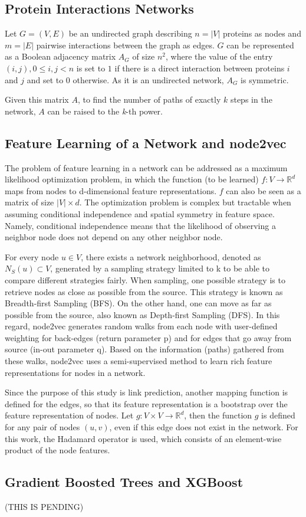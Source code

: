 \subsection*{Protein Interactions Networks}
Let $G=(V,E)$ be an undirected graph describing $n=|V|$ proteins as 
nodes and $m=|E|$ pairwise interactions between the graph as edges. 
$G$ can be represented as a Boolean adjacency matrix $A_G$ of size 
$n^2$, where the value of the entry $(i,j), 0\leq i,j < n$ is set 
to $1$ if there is a direct interaction between proteins $i$ and $j$ 
and set to $0$ otherwise. As it is an undirected network, $A_G$ is symmetric.

Given this matrix $A$, to find the number of paths of exactly $k$ steps 
in the network, $A$ can be raised to the \textit{k}-th power.

\subsection*{Feature Learning of a Network and node2vec}
The problem of feature learning in a network can be addressed as a maximum 
likelihood optimization problem, in which the function (to be learned) 
$f : V \rightarrow \mathbb{R}^d$ maps from nodes to d-dimensional feature 
representations. $f$ can also be seen as a matrix of size $|V| \times d$. 
The optimization problem is complex but tractable when assuming conditional 
independence and spatial symmetry in feature space. Namely, conditional 
independence means that the likelihood of observing a neighbor node does 
not depend on any other neighbor node.

For every node $u \in V$, there exists a network neighborhood, denoted as 
$N_S (u) \subset V$, generated by a sampling strategy limited to k to be 
able to compare different strategies fairly. When sampling, one possible strategy is to retrieve nodes as close as possible from the source. This strategy is known as Breadth-first Sampling (BFS). On the other hand, one can move as far as possible from the source, also known as Depth-first Sampling (DFS). In this regard, node2vec generates random walks from each node with user-defined weighting for back-edges (return parameter p) and for edges that go away from source (in-out parameter q). Based on the information (paths) gathered from these walks, node2vec uses a semi-supervised method to learn rich feature representations for nodes in a network.

Since the purpose of this study is link prediction, another mapping function is defined for the edges, so that its feature representation is a bootstrap over the feature representation of nodes. Let $g : V \times V \rightarrow \mathbb{R}^d$, then the function $g$ is defined for any pair of nodes $(u,v)$, even if this edge does not exist in the network. For this work, the Hadamard operator is used, which consists of an element-wise product of the node features.

\subsection*{Gradient Boosted Trees and XGBoost}
(THIS IS PENDING)